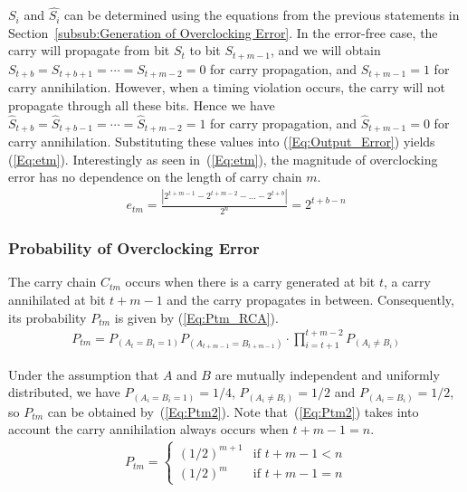 \documentclass[prodmode,acmtrets]{acmsmall} %
\begin{document}
$S_i$ and $\hat{S_i}$ can be determined using the equations from the previous statements in Section~\ref{subsub:Generation of Overclocking Error}. In the error-free case, the carry will propagate from bit $S_t$ to bit $S_{t+m-1}$, and we will obtain $S_{t+b}=S_{t+b+1}=\cdots=S_{t+m-2}=0$ for carry propagation, and $S_{t+m-1}=1$ for carry annihilation. However, when a timing violation occurs, the carry will not propagate through all these bits. Hence we have $\hat{S}_{t+b}=\hat{S}_{t+b-1}=\cdots=\hat{S}_{t+m-2}=1$ for carry propagation, and $\hat{S}_{t+m-1}=0$ for carry annihilation. Substituting these values into (\ref{Eq:Output_Error}) yields (\ref{Eq:etm}). Interestingly as seen in~(\ref{Eq:etm}), the magnitude of overclocking error has no dependence on the length of carry chain $m$.
%
\begin{eqnarray}\label{Eq:etm}
    e_{tm} = \frac{\left|2^{t+m-1}-2^{t+m-2}-\dots-2^{t+b}\right|}{2^n} = 2^{t+b-n}
\end{eqnarray}

\subsubsection{Probability of Overclocking Error}
The carry chain $C_{tm}$ occurs when there is a carry generated at bit $t$, a carry annihilated at bit $t+m-1$ and the carry propagates in between. Consequently, its probability $P_{tm}$ is given by (\ref{Eq:Ptm_RCA}).
%
\begin{eqnarray}\label{Eq:Ptm_RCA}
  P_{tm}=P_{(A_t=B_t=1)}P_{(A_{t+m-1}=B_{t+m-1})}\cdot \prod_{i=t+1}^{t+m-2}P_{(A_i\neq B_i)}
\end{eqnarray}

Under the assumption that $A$ and $B$ are mutually independent and uniformly distributed, we have $P_{(A_i=B_i=1)}=1/4$, $P_{(A_i\neq B_i)}=1/2$ and $P_{(A_i=B_i)}=1/2$, so $P_{tm}$ can be obtained by~(\ref{Eq:Ptm2}). Note that~(\ref{Eq:Ptm2}) takes into account the carry annihilation always occurs when $t+m-1=n$. 
%
\begin{eqnarray}\label{Eq:Ptm2}
    P_{tm}=\left\{\begin{array}{ll}
      (1/2)^{m+1} & \textrm{if $t+m-1<n$}\\
      (1/2)^{m} & \textrm{if $t+m-1=n$}
    \end{array} \right.
\end{eqnarray}
\end{document}
